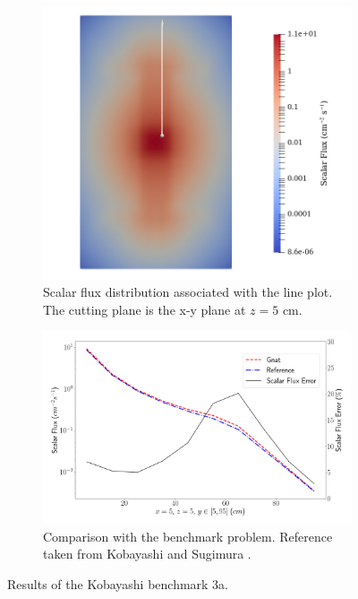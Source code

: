 \begin{figure}[H]
    \centering
    \begin{subfigure}[b]{0.4\textwidth}
        \centering
        \includegraphics[width=\textwidth]{images/verification/sn_kobayashi/3/kobayashi_3a_flux_map.png}
        \caption{Scalar flux distribution associated with the line plot. The cutting plane is the x-y plane at $z = 5\text{ cm}$.}
        \label{fig:verification:sn_kobayashi_3a:flux}
    \end{subfigure}
    \hfill
    \begin{subfigure}[b]{0.59\textwidth}
        \centering
        \includegraphics[width=\textwidth]{images/verification/sn_kobayashi/3/kobayashi_3a.png}
        \caption{Comparison with the benchmark problem. Reference taken from Kobayashi and Sugimura \cite{kobayashi_benchmarks}.}
        \label{fig:verification:sn_kobayashi_3a:line_plot}
    \end{subfigure}
    \caption{Results of the Kobayashi benchmark 3a.}
    \label{fig:verification:sn_kobayashi_3a}
\end{figure}

